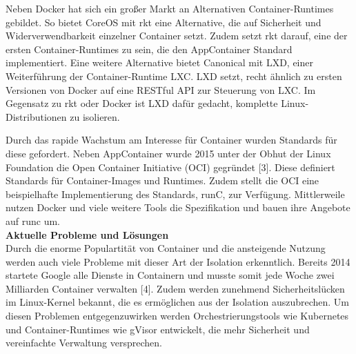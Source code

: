 \begin{multicols}{2}
Neben Docker hat sich ein großer Markt an Alternativen Container-Runtimes gebildet. So bietet CoreOS mit rkt eine Alternative, die auf Sicherheit und Widerverwendbarkeit einzelner Container setzt. Zudem setzt rkt darauf, eine der ersten Container-Runtimes zu sein, die den AppContainer Standard implementiert. Eine weitere Alternative bietet Canonical mit LXD, einer Weiterführung der Container-Runtime LXC. LXD setzt, recht ähnlich zu ersten Versionen von Docker auf eine RESTful API zur Steuerung von LXC. Im Gegensatz zu rkt oder Docker ist LXD dafür gedacht, komplette Linux-Distributionen zu isolieren. 

Durch das rapide Wachstum am Interesse für Container wurden Standards für diese gefordert. Neben AppContainer wurde 2015 unter der Obhut der Linux Foundation die Open Container Initiative (OCI) gegründet [3]. Diese definiert Standards für Container-Images und Runtimes. Zudem stellt die OCI eine beispielhafte Implementierung des Standards, runC, zur Verfügung. Mittlerweile nutzen Docker und viele weitere Tools die Spezifikation und bauen ihre Angebote auf runc um.\\

 \textbf{Aktuelle Probleme und Lösungen} \\


Durch die enorme Populartität von Container und die ansteigende Nutzung werden auch viele Probleme mit dieser Art der Isolation erkenntlich. Bereits 2014 startete Google alle Dienste in Containern und musste somit jede Woche zwei Milliarden Container verwalten [4]. Zudem werden zunehmend Sicherheitslücken im Linux-Kernel bekannt, die es ermöglichen aus der Isolation auszubrechen. Um diesen Problemen entgegenzuwirken werden Orchestrierungstools wie Kubernetes und Container-Runtimes wie gVisor entwickelt, die mehr Sicherheit und vereinfachte Verwaltung versprechen.\\
\end{multicols}
\def\footnoterule{}
